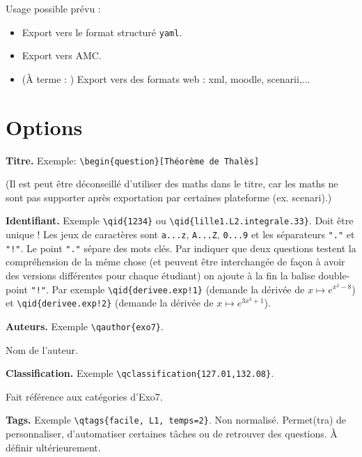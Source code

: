 \documentclass[12pt,a4paper]{article}
\begin{document}
Usage possible prévu  :
\begin{itemize}
  \item Export vers le format structuré \texttt{yaml}.
  \item Export vers AMC.
  \item (À terme : ) Export vers des formats web : xml, moodle, scenarii,...
\end{itemize}

\section{Options}

\textbf{Titre.} Exemple: \verb|\begin{question}[Théorème de Thalès]|

(Il est peut être déconseillé d'utiliser des maths dans le titre, car les maths ne sont pas supporter après exportation par certaines plateforme (ex. scenari).)

\bigskip
\textbf{Identifiant.} Exemple \verb|\qid{1234}| ou \verb|\qid{lille1.L2.integrale.33}|. Doit être unique ! 
Les jeux de caractères sont \texttt{a...z}, \texttt{A...Z}, \texttt{0...9} et les séparateurs \texttt{"."} et \texttt{"!"}. Le point \texttt{"."} sépare des mots clés. 
Par indiquer que deux questions testent la compréhension de la même chose (et peuvent être interchangée de façon à avoir des versions différentes pour chaque étudiant) on ajoute à la fin la balise double-point \texttt{"!"}.
Par exemple \verb|\qid{derivee.exp!1}| (demande la dérivée de $x \mapsto e^{x^2-8}$)
et \verb|\qid{derivee.exp!2}| (demande la dérivée de $x \mapsto e^{3x^3+1}$).





\bigskip
\textbf{Auteurs.} Exemple \verb|\qauthor{exo7}|. 

Nom de l'auteur.

\bigskip
\textbf{Classification.} Exemple \verb|\qclassification{127.01,132.08}|. 

Fait référence aux catégories d'Exo7.

\bigskip
\textbf{Tags.} Exemple \verb|\qtags{facile, L1, temps=2}|. Non normalisé. Permet(tra) de personnaliser, d'automatiser certaines tâches ou de retrouver des questions. À définir ultérieurement.
\end{document}
